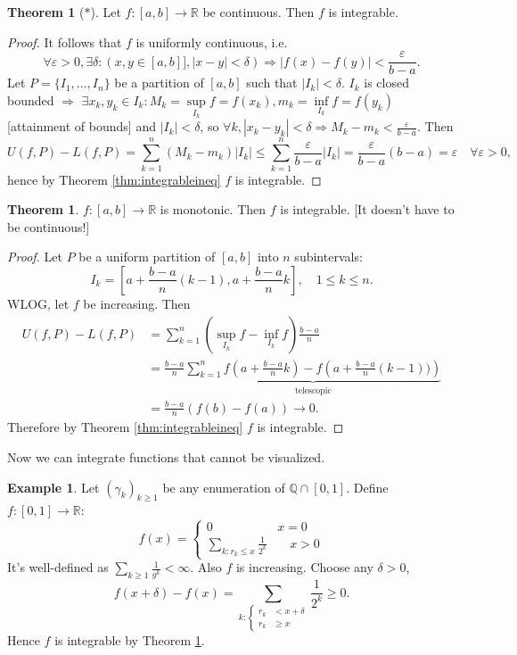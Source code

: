 \documentclass[a4paper]{article}
\theoremstyle{definition}
\newtheorem{thm}[defn]{Theorem}
\newtheorem{example}[defn]{Example}
\begin{document}
\begin{thm}[$\ast$]
\label{thm:contonclosedintisint}
	Let $f:[a,b]\rightarrow \mathbb R$ be continuous. Then $f$ is integrable.
\end{thm}

\begin{proof}
	It follows that $f$ is uniformly continuous, i.e.
\[
\forall \varepsilon >0, \exists \delta: (x,y\in [a,b]], |x-y|<\delta) \Rightarrow |f(x)-f(y)|<\frac{\varepsilon}{b-a} .
\]
Let $P=\{I_1,\ldots,I_n\}$ be a partition of $[a,b]$ such that $|I_k|<\delta$. $I_k$ is closed bounded $\Rightarrow$ $\exists x_k,y_k \in I_k : M_k = \underset{I_k}{\sup} f= f(x_k), m_k = \underset{I_k}{\inf} f= f(y_k)$ [attainment of bounds] and $|I_k|<\delta$, so $\forall k, |x_k-y_k|<\delta \Rightarrow M_k-m_k < \frac{\varepsilon}{b-a}$. Then
\[
U(f,P)-L(f,P) = \sum_{k=1}^{n}(M_k-m_k)|I_k| \leq \sum_{k=1}^n \frac{\varepsilon}{b-a}|I_k|=\frac{\varepsilon}{b-a}(b-a)=\varepsilon \quad \forall \varepsilon>0 ,
\]
hence by Theorem \ref{thm:integrableineq} $f$ is integrable.
\end{proof}

\begin{thm}
\label{thm:monoimpint}
	$f:[a,b]\rightarrow \mathbb R$ is monotonic. Then $f$ is integrable. [It doesn't have to be continuous!]
\end{thm}
\begin{proof}
	Let $P$ be a uniform partition of $[a,b]$ into $n$ subintervals:
\[
I_k=\left[a+\frac{b-a}{n}(k-1),a+\frac{b-a}{n}k\right], \quad 1 \leq k \leq n .
\]
WLOG, let $f$ be increasing. Then
\[
\begin{aligned}
		U(f,P)-L(f,P)&=\sum_{k=1}^n \left( \underset{I_k}{\sup} f-\underset{I_k}{\inf} f \right) \frac{b-a}{n} \\ &=\frac{b-a}{n} \underbrace{\sum_{k=1}^n f\left( a+\frac{b-a}{n}k \right)-f\left( a+\frac{b-a}{n}(k-1)) \right)}_{\text{telescopic}} \\&= \frac{b-a}{n}(f(b)-f(a)) \rightarrow 0 .
	\end{aligned}
\]
Therefore by Theorem \ref{thm:integrableineq} $f$ is integrable.
\end{proof}

Now we can integrate functions that cannot be visualized.

\begin{example}
	Let $(\gamma_k)_{k\geq 1}$ be any enumeration of $\mathbb Q \cap [0,1]$. Define $f:[0,1]\rightarrow \mathbb R$:
\[
f(x)=\left\{ \begin{aligned}
		0 \quad &x=0 \\ \sum_{k: r_k \leq x} \frac{1}{2^k} &\quad x>0
	\end{aligned} \right.
\]
It's well-defined as $\sum_{k\geq 1} \frac1{g^k} < \infty$. Also $f$ is increasing. Choose any $\delta >0$,
\[
f(x+\delta)-f(x) = \sum_{k:\left\{\begin{aligned}r_k&<x+\delta\\ r_k&\geq x\end{aligned}\right.} \frac{1}{2^k} \geq 0 .
\]
Hence $f$ is integrable by Theorem \ref{thm:monoimpint}.
\end{example}
\end{document}
